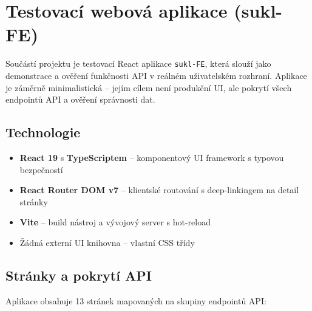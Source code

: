 \documentclass[12pt,a4paper]{article}
\begin{document}
\section{Testovací webová aplikace (sukl-FE)}

Součástí projektu je testovací React aplikace \texttt{sukl-FE}, která slouží jako demonstrace a ověření funkčnosti API v reálném uživatelském rozhraní. Aplikace je záměrně minimalistická -- jejím cílem není produkční UI, ale pokrytí všech endpointů API a ověření správnosti dat.

\subsection{Technologie}

\begin{itemize}
  \item \textbf{React 19} s \textbf{TypeScriptem} -- komponentový UI framework s typovou bezpečností
  \item \textbf{React Router DOM v7} -- klientské routování s deep-linkingem na detail stránky
  \item \textbf{Vite} -- build nástroj a vývojový server s hot-reload
  \item Žádná externí UI knihovna -- vlastní CSS třídy
\end{itemize}

\subsection{Stránky a pokrytí API}

Aplikace obsahuje 13 stránek mapovaných na skupiny endpointů API:
\end{document}
